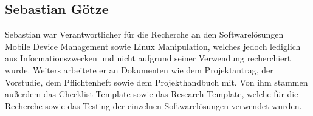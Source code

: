 \subsection{Sebastian Götze}
Sebastian war Verantwortlicher für die Recherche an den Softwarelösungen Mobile Device Management sowie Linux Manipulation, welches jedoch lediglich aus Informationszwecken und nicht aufgrund seiner Verwendung recherchiert wurde. Weiters arbeitete er an Dokumenten wie dem Projektantrag, der Vorstudie, dem Pflichtenheft sowie dem Projekthandbuch mit. Von ihm stammen außerdem das Checklist Template sowie das Research Template, welche für die Recherche sowie das Testing der einzelnen Softwarelösungen verwendet wurden.



